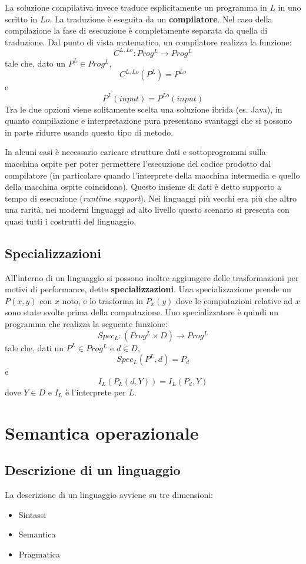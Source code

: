 \documentclass{article}[10pt]
\begin{document}
	La soluzione compilativa invece traduce esplicitamente un programma in $L$ in uno scritto in $Lo$. La traduzione è eseguita da un \textbf{compilatore}. Nel caso della compilazione la fase di esecuzione è completamente separata da quella di traduzione. Dal punto di vista matematico, un compilatore realizza la funzione:
	$$C^{L,Lo}:Prog^L \to Prog^L$$ tale che, dato un $P^L \in Prog^L$, 
	$$C^{L,Lo}(P^L)=P^{Lo}$$ e $$P^L(input)=P^{Lo}(input)$$
	Tra le due opzioni viene solitamente scelta una soluzione ibrida (es. Java), in quanto compilazione e interpretazione pura presentano svantaggi che si possono in parte ridurre usando questo tipo di metodo. 
	
	In alcuni casi è necessario caricare strutture dati e sottoprogrammi sulla macchina ospite per poter permettere l'esecuzione del codice prodotto dal compilatore (in particolare quando l'interprete della macchina intermedia e quello della macchina ospite coincidono). Questo insieme di dati è detto supporto a tempo di esecuzione (\textit{runtime support}). Nei linguaggi più vecchi era più che altro una rarità, nei moderni linguaggi ad alto livello questo scenario si presenta con quasi tutti i costrutti del linguaggio. \\
	
	\subsection{Specializzazioni}
	All'interno di un linguaggio si possono inoltre aggiungere delle trasformazioni per motivi di performance, dette \textbf{specializzazioni}.
	Una specializzazione prende un $P(x,y)$ con $x$ noto, e lo trasforma in $P_x(y)$ dove le computazioni relative ad $x$ sono state svolte prima della computazione. 
	Uno specializzatore è quindi un programma che realizza la seguente funzione: $$Spec_L:(Prog^L \times D) \to Prog^L$$ tale che, dati un $P^L \in Prog^L$ e $d \in D$, $$Spec_L(P^L,d)=P_d$$ e $$I_L(P_L(d,Y))=I_L(P_d,Y)$$ dove $Y \in D$ e $I_L$ è l'interprete per $L$.
	\newpage
	
	\section{Semantica operazionale}
	
	
	\subsection{Descrizione di un linguaggio}
	La descrizione di un linguaggio avviene su tre dimensioni:
	\begin{itemize}
		\item Sintassi
		\item Semantica
		\item Pragmatica
	\end{itemize}
\end{document}
